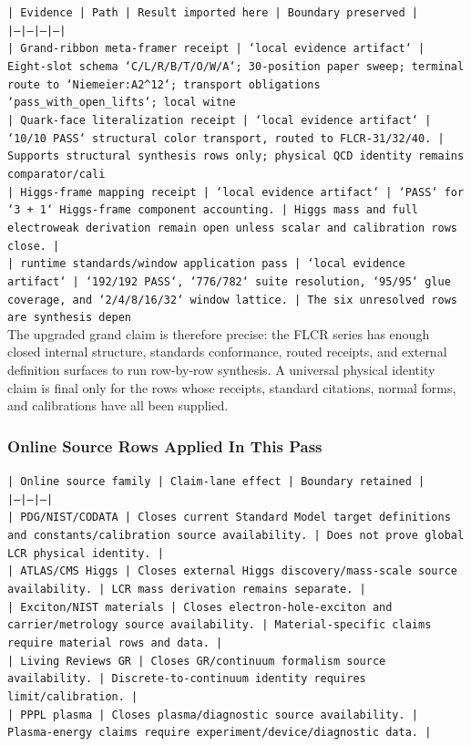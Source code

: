 \documentclass[11pt]{article}
\begin{document}
\noindent\texttt{| Evidence | Path | Result imported here | Boundary preserved |}\\
\noindent\texttt{|---|---|---|---|}\\
\noindent\texttt{| Grand-ribbon meta-framer receipt | `local evidence artifact` | Eight-slot schema `C/L/R/B/T/O/W/A`; 30-position paper sweep; terminal route to `Niemeier:A2\textasciicircum{}12`; transport obligations `pass\_with\_open\_lifts`; local witne}\\
\noindent\texttt{| Quark-face literalization receipt | `local evidence artifact` | `10/10 PASS` structural color transport, routed to FLCR-31/32/40. | Supports structural synthesis rows only; physical QCD identity remains comparator/cali}\\
\noindent\texttt{| Higgs-frame mapping receipt | `local evidence artifact` | `PASS` for `3 + 1` Higgs-frame component accounting. | Higgs mass and full electroweak derivation remain open unless scalar and calibration rows close. |}\\
\noindent\texttt{| runtime standards/window application pass | `local evidence artifact` | `192/192 PASS`, `776/782` suite resolution, `95/95` glue coverage, and `2/4/8/16/32` window lattice. | The six unresolved rows are synthesis depen}\\

The upgraded grand claim is therefore precise: the FLCR series has enough closed internal structure, standards conformance, routed receipts, and external definition surfaces to run row-by-row synthesis. A universal physical identity claim is final only for the rows whose receipts, standard citations, normal forms, and calibrations have all been supplied.

\subsubsection*{Online Source Rows Applied In This Pass}

\noindent\texttt{| Online source family | Claim-lane effect | Boundary retained |}\\
\noindent\texttt{|---|---|---|}\\
\noindent\texttt{| PDG/NIST/CODATA | Closes current Standard Model target definitions and constants/calibration source availability. | Does not prove global LCR physical identity. |}\\
\noindent\texttt{| ATLAS/CMS Higgs | Closes external Higgs discovery/mass-scale source availability. | LCR mass derivation remains separate. |}\\
\noindent\texttt{| Exciton/NIST materials | Closes electron-hole-exciton and carrier/metrology source availability. | Material-specific claims require material rows and data. |}\\
\noindent\texttt{| Living Reviews GR | Closes GR/continuum formalism source availability. | Discrete-to-continuum identity requires limit/calibration. |}\\
\noindent\texttt{| PPPL plasma | Closes plasma/diagnostic source availability. | Plasma-energy claims require experiment/device/diagnostic data. |}\\
\end{document}
